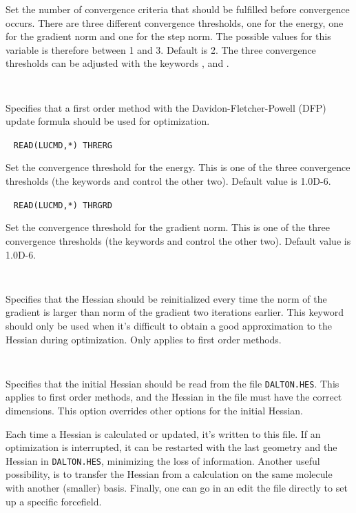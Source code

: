 \begin{description}
Set the number of convergence criteria that should be fulfilled before
convergence occurs. There are three different convergence thresholds,
one for the energy, one for the gradient norm and one for the step
norm. The possible values for this variable is therefore between 1 and
3. Default is 2. The three convergence thresholds can be adjusted with
the keywords ,  and .

\item[\Key{DFP}]\verb| |

Specifies that a first order method with the
Davidon-Fletcher-Powell (DFP) update formula should be used
for optimization.

\item[\Key{ENERGY}]\verb| |
\newline
\verb|READ(LUCMD,*) THRERG|

Set the convergence threshold for the energy. This is one of the three
convergence thresholds (the keywords  and 
control the other two). Default value is 1.0D-6.

\item[\Key{GRADIE}]\verb| |
\newline
\verb|READ(LUCMD,*) THRGRD|

Set the convergence threshold for the gradient norm. This is one of
the three convergence thresholds (the keywords  and
 control the other two). Default value is 1.0D-6.

\item[\Key{GRDINI}]\verb| |

Specifies that the Hessian should be reinitialized every time the norm
of the gradient is larger than norm of the gradient two iterations
earlier. This keyword should only be used when it's difficult to
obtain a good approximation to the Hessian during optimization. Only
applies to first order methods.

\item[\Key{HESFIL}]\verb| |

Specifies that the initial Hessian should be read from the file
\verb|DALTON.HES|. This applies to first order methods, and the
Hessian in the file must have the correct dimensions. This option
overrides other options for the initial Hessian.

Each time a Hessian is calculated or updated, it's written to this
file. If an optimization is interrupted, it can be restarted with the
last geometry and the Hessian in \verb|DALTON.HES|, minimizing the
loss of information. Another useful possibility, is to transfer
the Hessian from a calculation on the same molecule with another
(smaller) basis. Finally, one can go in an edit the file directly to
set up a specific forcefield.


\end{description}
